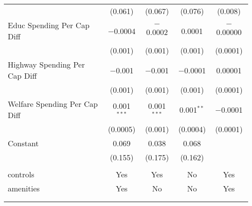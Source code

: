 \begin{table}[!htbp]
\begin{tabular}{@{\extracolsep{5pt}}lcccc}
  & (0.061) & (0.067) & (0.076) & (0.008) \\ 
  Educ Spending Per Cap Diff & $-$0.0004 & $-$0.0002 & 0.0001 & $-$0.00000 \\ 
  & (0.001) & (0.001) & (0.001) & (0.0001) \\ 
  Highway Spending Per Cap Diff & $-$0.001 & $-$0.001 & $-$0.0001 & 0.00001 \\ 
  & (0.001) & (0.001) & (0.001) & (0.0001) \\ 
  Welfare Spending Per Cap Diff & 0.001$^{***}$ & 0.001$^{***}$ & 0.001$^{**}$ & $-$0.0001 \\ 
  & (0.0005) & (0.001) & (0.0004) & (0.0001) \\ 
  Constant & 0.069 & 0.038 & 0.068 &  \\ 
  & (0.155) & (0.175) & (0.162) &  \\ 
 \hline \\[-1.8ex] 
controls & Yes & Yes & No & Yes \\ 
amenities & Yes & No & No & Yes \\ 
\hline \\[-1.8ex] 
\hline 
\hline \\[-1.8ex] 
\end{tabular} 
\end{table} 
